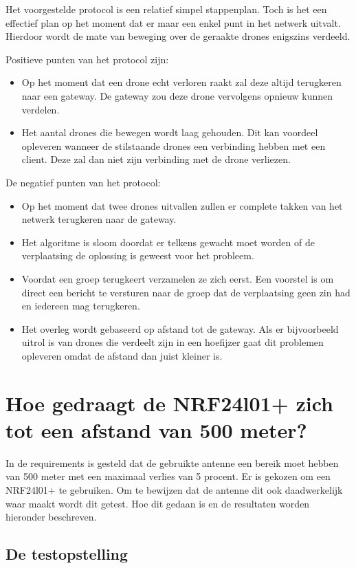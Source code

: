 \documentclass[a4paper, 11pt, oneside]{report}
\begin{document}
Het voorgestelde protocol is een relatief simpel stappenplan. 
Toch is het een effectief plan op het moment dat er maar een enkel punt in het netwerk uitvalt. 
Hierdoor wordt de mate van beweging over de geraakte drones enigszins verdeeld.

Positieve punten van het protocol zijn:
\begin{itemize}
	\item Op het moment dat een drone echt verloren raakt zal deze altijd terugkeren naar een gateway. De gateway zou deze drone vervolgens opnieuw kunnen verdelen.
	\item Het aantal drones die bewegen wordt laag gehouden. Dit kan voordeel opleveren wanneer de stilstaande drones een verbinding hebben met een client. Deze zal dan niet zijn verbinding met de drone verliezen.
\end{itemize}


De negatief punten van het protocol:
\begin{itemize}
	\item Op het moment dat twee drones uitvallen zullen er complete takken van het netwerk terugkeren naar de gateway.
	\item Het algoritme is sloom doordat er telkens gewacht moet worden of de verplaatsing de oplossing is geweest voor het probleem.
	\item Voordat een groep terugkeert verzamelen ze zich eerst. Een voorstel is om direct een bericht te versturen naar de groep dat de verplaatsing geen zin had en iedereen mag terugkeren.
	\item Het overleg wordt gebaseerd op afstand tot de gateway. Als er bijvoorbeeld uitrol is van drones die verdeelt zijn in een hoefijzer gaat dit problemen opleveren omdat de afstand dan juist kleiner is.
\end{itemize} 

\section[NRF24l01+ afstand test]{Hoe gedraagt de NRF24l01+ zich tot een afstand van 500 meter?}

In de requirements is gesteld dat de gebruikte antenne een bereik moet hebben van 500 meter met een maximaal verlies van 5 procent.
Er is gekozen om een NRF24l01+ te gebruiken.
Om te bewijzen dat de antenne dit ook daadwerkelijk waar maakt wordt dit getest.
Hoe dit gedaan is en de resultaten worden hieronder beschreven.

\subsection{De testopstelling}
\end{document}
